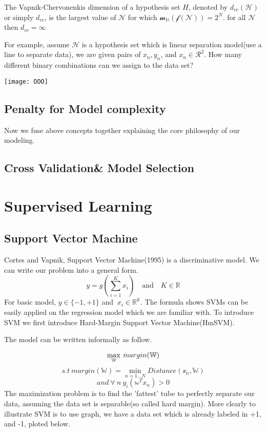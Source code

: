 \begin{defn}
The Vapnik-Chervonenkis dimension of a hypothesis set $\mathcal{}{H}$, denoted by $d_{vc}(\mathcal{H})$ or simply $d_{vc}$, is the largest value of $\mathcal{N}$ for which $\mathcal{m_{\mathbb{H}}}(\mathcal{f(N)})= 2^{N}$. for all $\mathcal{N}$ then $d_{vc}=\infty$

\end{defn}
%
For example, assume $\mathcal{H}$ is a hypothesis set which is linear separation model(use a line to separate data), we are given pairs of ${x_{n}, y_{n}} $, and $ x_{n} \in \mathcal{R^2}$. How many different binary combinations can we assign to the data set?

\begin{center}
{
\texttt{[image: OOO]}
}
\end{center}

\subsection*{Penalty for Model complexity}
Now we fuse above concepts together explaining the core philosophy of our modeling.


\subsection*{Cross Validation\& Model Selection}

\section{Supervised Learning}

\subsection{Support Vector Machine}

Cortes and Vapnik, Support Vector Machine(1995) is a discriminative model. We can write our problem into a general form.
$$ y = g(\sum^{K}_{i=1}{x_{i}}) \quad \textrm{and} \quad K \in \mathbb{R}$$
For basic model, $y \in \{-1, +1\}$  and $\ x_{i} \in \mathbb{R^{K}}$.
The formula shows SVMs can be easily applied on the regression model which we are familiar with. To introduce SVM we first introduce Hard-Margin Support Vector Machine(HmSVM).
\clearpage

The model can be written informally as follow.

$$\large{\max_{\mathbb{W}}} \ margin(\mathbb{W})$$
$$ s.t\ margin(\mathbb{W})=\min_{n=1...N} Distance(\mathbb{x_{n}},\mathbb{W})$$
$$ and\ \forall \ n \ y_{i}(\mathbb{w}^Tx_{n})>0$$
The maximization problem is to find the 'fattest' tube to perfectly separate our data, assuming the data set is separable(so called hard margin).
More clearly to illustrate SVM is to use graph, we have a data set which is already labeled in +1, and -1, ploted below.\\

